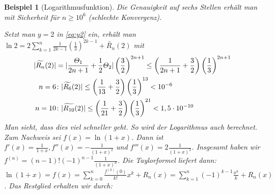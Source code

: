 \documentclass[ngerman,titlepage,twoside, parskip=half*]{scrreprt}
\theoremstyle{break}
\theoremstyle{nonumberbreak}
\newtheorem{beispiel}{Beispiel}
\DeclarePairedDelimiter{\abs}{\lvert}{\rvert}
\begin{document}
\begin{beispiel}[Logarithmusfunktion]
  Die Genauigkeit auf sechs Stellen erhält man mit Sicherheit für
  $n\geq 10^6$ (schlechte Konvergenz).

  Setzt man $y=2$ in \autoref{eq:y2} ein, erhält man $\ln 2=2\sum_{k=1}^n 
  \frac{1}{2k-1}\left( \frac{1}{3} \right)^{2k-1}+\widetilde{R_n}(2)$ mit
  \begin{align*}
    \abs{\widetilde{R_n}(2)} &=\abs{\frac{\Theta_1}{2n+1}+\frac{1}{2}\Theta_2}
    \left( \frac{3}{2} \right)^{2n+1}\leq\left(
      \frac{1}{2n+1}+\frac{3}{2} \right)
    \left(\frac{1}{3}\right)^{2n+1}\\
    n=6 &\colon \abs{\widetilde{R_6}(2)}\leq \left( \frac{1}{13}+\frac{3}{2} \right)
    \left( \frac{1}{3} \right)^{13}<10^{-6}\\
    n=10 &\colon \abs{\widetilde{R_{10}}(2)}\leq \left( \frac{1}{21}+\frac{3}{2} \right)
    \left( \frac{1}{3} \right)^{21}<1,5\cdot 10^{-10}
  \end{align*}
  Man sieht, dass dies viel schneller geht. So wird der Logarithmus
  auch berechnet. Zum Nachweis sei $f(x)=\ln(1+x)$. Dann ist $f'(x)=
  \frac{1}{1+x}, f''(x)= -\frac{1}{(1+x)^{2}}$ und $f'''(x)=
  2\frac{1}{(1+x)^{3}}$. Insgesamt haben wir $f^{(n)}= (n-1)!
  (-1)^{n-1} \frac{1}{(1+x)^{n}}$. Die Taylorformel liefert dann:
  $\ln(1+x)= f(x)= \sum_{k=0}^{n} \frac{f^{(k)} (0)}{k!} x^{k}+
  R_{n} (x)= \sum_{k=1}^n (-1)^{k-1}\frac{x^k}{k}+R_n(x)$. Das
  Restglied erhalten wir durch:
  

\end{beispiel}
\end{document}
